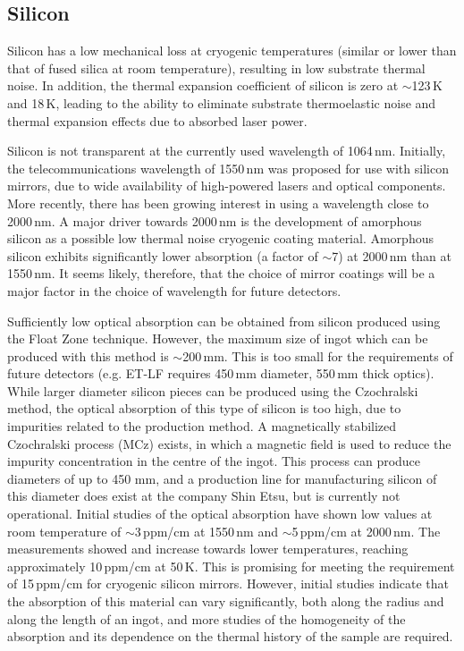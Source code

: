 \subsection{Silicon}
Silicon has a low mechanical loss at cryogenic temperatures (similar or lower than that of fused silica at room temperature), resulting in low substrate thermal noise. In addition, the thermal expansion coefficient of silicon is zero at $\sim$123\,K and 18\,K, leading to the ability to eliminate substrate thermoelastic noise and thermal expansion effects due to absorbed laser power.

Silicon is not transparent at the currently used wavelength of 1064\,nm. Initially, the telecommunications wavelength of 1550\,nm was proposed for use with silicon mirrors, due to wide availability of high-powered lasers and optical components. More recently, there has been growing interest in using a wavelength close to 2000\,nm. A major driver towards 2000\,nm is the development of amorphous silicon as a possible low thermal noise cryogenic coating material. Amorphous silicon exhibits significantly lower absorption (a factor of $\sim$7) at 2000\,nm than at 1550\,nm. It seems likely, therefore, that the choice of mirror coatings will be a major factor in the choice of wavelength for future detectors. 

Sufficiently low optical absorption can be obtained from silicon produced using the Float Zone technique. However, the maximum size of ingot which can be produced with this method is $\sim$200\,mm. This is too small for the requirements of future detectors (e.g. ET-LF requires 450\,mm diameter, 550\,mm thick optics). While larger diameter silicon pieces can be produced using the Czochralski method, the optical absorption of this type of silicon is too high, due to impurities related to the production method. A magnetically stabilized Czochralski process (MCz) exists, in which a magnetic field is used to reduce the impurity concentration in the centre of the ingot. This process can produce diameters of up to 450 mm, and a production line for manufacturing silicon of this diameter does exist at the company Shin Etsu, but is currently not operational. Initial studies of the optical absorption have shown low values at room temperature of $\sim$3\,ppm/cm at 1550\,nm and $\sim$5\,ppm/cm at 2000\,nm. The measurements showed and increase towards lower temperatures, reaching approximately 10\,ppm/cm at 50\,K. This is promising for meeting the requirement of 15\,ppm/cm for cryogenic silicon mirrors. However, initial studies indicate that the absorption of this material can vary significantly, both along the radius and along the length of an ingot, and more studies of the homogeneity of the absorption and its dependence on the thermal history of the sample are required. 

